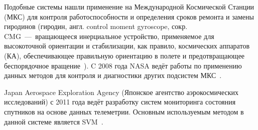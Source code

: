 Подобные системы нашли применение на Международной Космической Станции (МКС) для контроля работоспособности и определения сроков ремонта и замены гиродинов (гиродин, англ. control moment gyroscope, сокр. CMG~---~вращающееся инерциальное устройство, применяемое для высокоточной ориентации и стабилизации, как правило, космических аппаратов (КА), обеспечивающее правильную ориентацию в полете и предотвращающее беспорядочное вращение~\cite{WikiGirodyn}). C 2008 года NASA ведёт работы по применению данных методов для контроля и диагностики других подсистем МКС~\cite{IversonSHMforSpaceMissionOperations}.

Japan Aerospace Exploration Agency (Японское агентство аэрокосмических исследований) с 2011 года ведёт разработку систем мониторинга состояния спутников на основе данных телеметрии. Основным используемым методом в данной системе является SVM~\cite{SVMSatelliteMonitoring}.